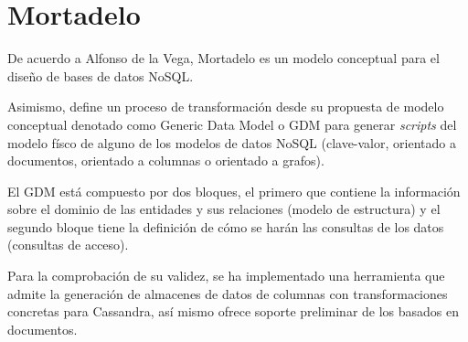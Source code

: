 \section{Mortadelo}
De acuerdo a Alfonso de la Vega\cite{de_la_vega_mortadelo_2020}, Mortadelo es un modelo conceptual para el diseño de bases de datos NoSQL. 


Asimismo, define un proceso de transformación desde su propuesta de modelo conceptual denotado como Generic Data Model o GDM para generar \textit{scripts} del modelo físco de alguno de los modelos de datos NoSQL (clave-valor, orientado a documentos, orientado a columnas o orientado a grafos). 


El GDM está compuesto por dos bloques, el primero que contiene la información sobre el dominio de las entidades y sus relaciones (modelo de estructura) y el segundo bloque tiene la definición de cómo se harán las consultas de los datos (consultas de acceso).


Para la comprobación de su validez, se ha implementado una herramienta que admite la generación de almacenes de datos de columnas con transformaciones concretas para Cassandra, así mismo ofrece soporte preliminar de los basados ​​en documentos.
